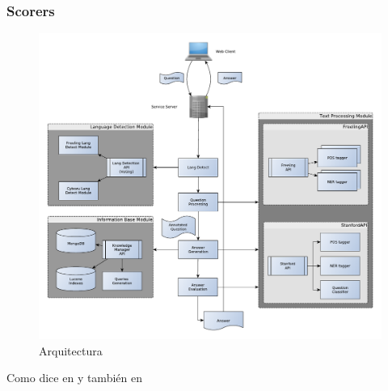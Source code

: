 \subsubsection{Scorers}
\label{subsec:scorers}


\begin{figure}
  \centering
    \includegraphics[scale=0.86]{graficos/Architecture}
  \caption{Arquitectura}
  \label{fig:Architecture}
\end{figure}

Como dice en \cite{greenwade93} y también en \cite{RE1}
%

